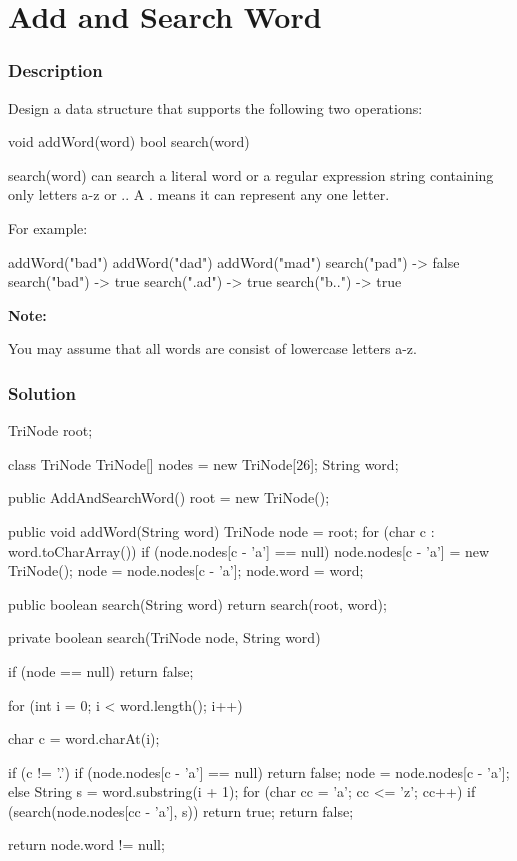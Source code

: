\newpage

\section{Add and Search Word} %

\subsubsection{Description}

Design a data structure that supports the following two operations:
\begin{Code}
void addWord(word)
bool search(word)
\end{Code}
search(word) can search a literal word or a regular expression string containing only letters a-z or .. A . means it can represent any one letter.

For example:
\begin{Code}
addWord("bad")
addWord("dad")
addWord("mad")
search("pad") -> false
search("bad") -> true
search(".ad") -> true
search("b..") -> true
\end{Code}
\textbf{Note:}

You may assume that all words are consist of lowercase letters a-z.

\subsubsection{Solution}

\begin{Code}
TriNode root;

class TriNode {
    TriNode[] nodes = new TriNode[26];
    String word;
}

public AddAndSearchWord() {
    root = new TriNode();
}

public void addWord(String word) {
    TriNode node = root;
    for (char c : word.toCharArray()) {
        if (node.nodes[c - 'a'] == null) {
            node.nodes[c - 'a'] = new TriNode();
        }
        node = node.nodes[c - 'a'];
    }
    node.word = word;
}

public boolean search(String word) {
    return search(root, word);
}

\end{Code}

\newpage
\begin{Code}
private boolean search(TriNode node, String word) {
    if (node == null) {
        return false;
    }

    for (int i = 0; i < word.length(); i++) {
        char c = word.charAt(i);

        if (c != '.') {
            if (node.nodes[c - 'a'] == null) {
                return false;
            }
            node = node.nodes[c - 'a'];
        } else {
            String s = word.substring(i + 1);
            for (char cc = 'a'; cc <= 'z'; cc++) {
                if (search(node.nodes[cc - 'a'], s)) {
                    return true;
                }
            }
            return false;
        }
    }

    return node.word != null;
}
\end{Code}


